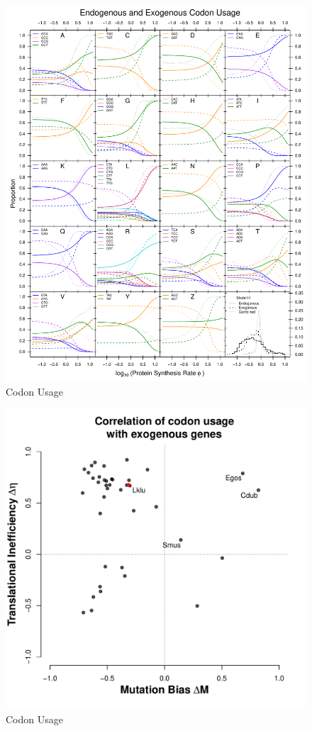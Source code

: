 \documentclass[12pt]{article}
\begin{document}
\begin{figure}[H]
     \centering
	\includegraphics[width=\textwidth]{img/CUB_cleft_main.pdf}
	\caption{Codon Usage}
	\label{fig:cub_all_aa}
\end{figure}


\begin{figure}[H]
     \centering
	\includegraphics[width=\textwidth]{img/csp_correlations.pdf}
	\caption{Codon Usage}
	\label{fig:corr_all_species}
\end{figure}
\end{document}
